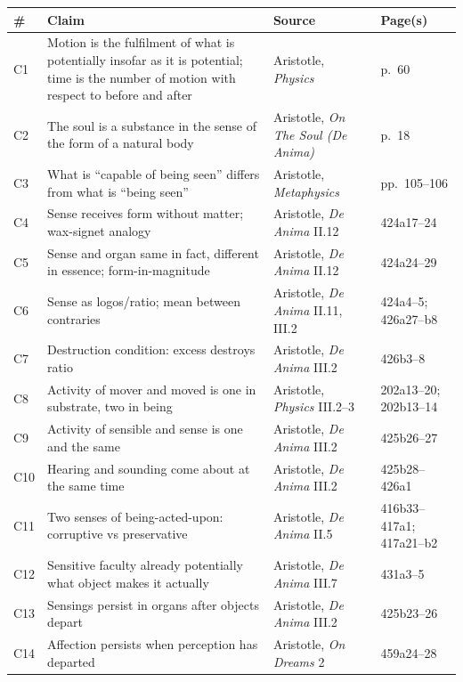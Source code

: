 \documentclass[12pt]{article}
\begin{document}
\begin{center}
\footnotesize
\begin{tabular}{|l|l|l|l|}
\hline
\textbf{\#} & \textbf{Claim} & \textbf{Source} & \textbf{Page(s)} \\
\hline
C1 & Motion is the fulfilment of what is potentially insofar as it is potential; time is the number of motion with respect to before and after & Aristotle, \textit{Physics} & p.~60 \\
\hline
C2 & The soul is a substance in the sense of the form of a natural body & Aristotle, \textit{On The Soul (De Anima)} & p.~18 \\
\hline
C3 & What is ``capable of being seen'' differs from what is ``being seen'' & Aristotle, \textit{Metaphysics} & pp.~105--106 \\
\hline
C4 & Sense receives form without matter; wax-signet analogy & Aristotle, \textit{De Anima} II.12 & 424a17--24 \\
\hline
C5 & Sense and organ same in fact, different in essence; form-in-magnitude & Aristotle, \textit{De Anima} II.12 & 424a24--29 \\
\hline
C6 & Sense as logos/ratio; mean between contraries & Aristotle, \textit{De Anima} II.11, III.2 & 424a4--5; 426a27--b8 \\
\hline
C7 & Destruction condition: excess destroys ratio & Aristotle, \textit{De Anima} III.2 & 426b3--8 \\
\hline
C8 & Activity of mover and moved is one in substrate, two in being & Aristotle, \textit{Physics} III.2--3 & 202a13--20; 202b13--14 \\
\hline
C9 & Activity of sensible and sense is one and the same & Aristotle, \textit{De Anima} III.2 & 425b26--27 \\
\hline
C10 & Hearing and sounding come about at the same time & Aristotle, \textit{De Anima} III.2 & 425b28--426a1 \\
\hline
C11 & Two senses of being-acted-upon: corruptive vs preservative & Aristotle, \textit{De Anima} II.5 & 416b33--417a1; 417a21--b2 \\
\hline
C12 & Sensitive faculty already potentially what object makes it actually & Aristotle, \textit{De Anima} III.7 & 431a3--5 \\
\hline
C13 & Sensings persist in organs after objects depart & Aristotle, \textit{De Anima} III.2 & 425b23--26 \\
\hline
C14 & Affection persists when perception has departed & Aristotle, \textit{On Dreams} 2 & 459a24--28 \\

\end{tabular}
\end{center}
\end{document}
